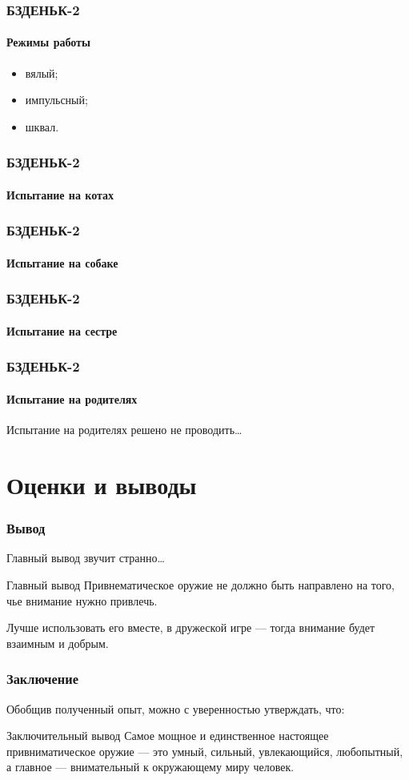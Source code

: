 \begin{frame}
    \frametitle{БЗДЕНЬК-2}
    \framesubtitle{Режимы работы}
    
    \begin{itemize}
        \item вялый;
        \item импульсный;
        \item шквал.
    \end{itemize}    
\end{frame}

\begin{frame}
    \frametitle{БЗДЕНЬК-2}
    \framesubtitle{Испытание на котах}
\end{frame}

\begin{frame}
    \frametitle{БЗДЕНЬК-2}
    \framesubtitle{Испытание на собаке}
\end{frame}

\begin{frame}
    \frametitle{БЗДЕНЬК-2}
    \framesubtitle{Испытание на сестре}
\end{frame}

\begin{frame}
    \frametitle{БЗДЕНЬК-2}
    \framesubtitle{Испытание на родителях}
    Испытание на родителях решено не проводить\ldots
\end{frame}


\section{Оценки и выводы}

\begin{frame}
    \frametitle{Вывод}
    
    Главный вывод звучит странно\ldots 
    
    \begin{block}{Главный вывод}
        Привнематическое оружие \alert{не должно} быть направлено на того, чье внимание нужно привлечь. 
    \end{block}
    
    Лучше использовать его вместе, в дружеской игре --- тогда внимание будет \alert{взаимным} и \alert{добрым}.
\end{frame}

\begin{frame}
    \frametitle{Заключение}
    
    Обобщив полученный опыт, можно с уверенностью утверждать, что:
    
    \begin{block}{Заключительный вывод}
        Самое мощное и \alert{единственное настоящее} привниматическое оружие --- это умный, сильный, увлекающийся, любопытный, а главное --- \alert{внимательный к окружающему миру} человек.
    \end{block}
\end{frame}
    
